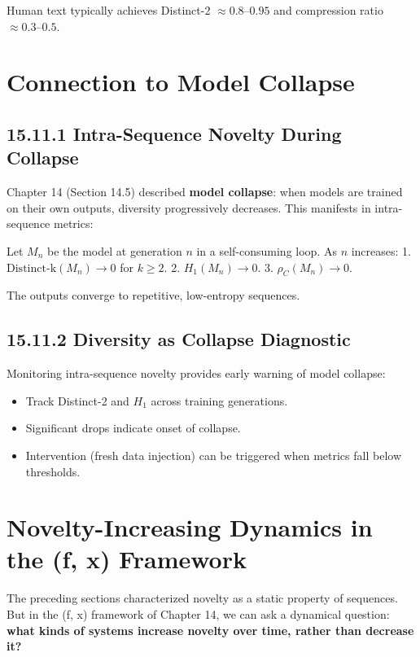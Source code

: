 Human text typically achieves Distinct-2 $\approx 0.8$--$0.95$ and compression ratio $\approx 0.3$--$0.5$.



\section{Connection to Model Collapse}

\subsection{15.11.1 Intra-Sequence Novelty During Collapse}

Chapter 14 (Section 14.5) described \textbf{model collapse}: when models are trained on their own outputs, diversity progressively decreases. This manifests in intra-sequence metrics:

\begin{proposition}
Let $M_n$ be the model at generation $n$ in a self-consuming loop. As $n$ increases:
1. $\mathrm{Distinct\text{-}k}(M_n) \to 0$ for $k \geq 2$.
2. $H_1(M_n) \to 0$.
3. $\rho_C(M_n) \to 0$.

The outputs converge to repetitive, low-entropy sequences.
\end{proposition}

\subsection{15.11.2 Diversity as Collapse Diagnostic}

Monitoring intra-sequence novelty provides early warning of model collapse:

\begin{itemize}
\item Track Distinct-2 and $H_1$ across training generations.
\item Significant drops indicate onset of collapse.
\item Intervention (fresh data injection) can be triggered when metrics fall below thresholds.
\end{itemize}



\section{Novelty-Increasing Dynamics in the (f, x) Framework}

The preceding sections characterized novelty as a static property of sequences. But in the (f, x) framework of Chapter 14, we can ask a dynamical question: \textbf{what kinds of systems increase novelty over time, rather than decrease it?}

